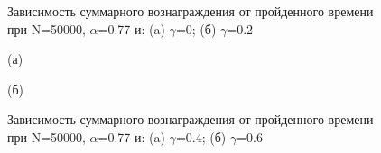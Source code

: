 \documentclass[a4paper]{report}
\theoremstyle{definition}
\theoremstyle{plain}
\theoremstyle{remark}
\theoremstyle{remark}
\theoremstyle{definition}
\begin{document}
\begin{figure}[H]
\begin{minipage}[H]{0.49\linewidth}
    \end{minipage}
     \caption{Зависимость суммарного вознаграждения от пройденного времени при N=50000, $\alpha$=0.77 и: (a) $\gamma$=0; (б) $\gamma$=0.2}
\end{figure}
\begin{figure}[H]
    \begin{minipage}[H]{0.49\linewidth}
        (а)\\
    \end{minipage}
    \hfill
    \begin{minipage}[H]{0.49\linewidth}
        (б)\\
    \end{minipage}
     \caption{Зависимость суммарного вознаграждения от пройденного времени при N=50000, $\alpha$=0.77 и: (a) $\gamma$=0.4; (б) $\gamma$=0.6}
\end{figure}
\end{document}
